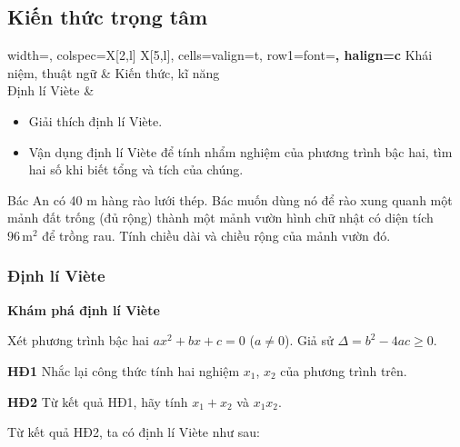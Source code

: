 \begin{lesson}
    \subsection{Kiến thức trọng tâm}

    \begin{center}
    \begin{tblr}{
        width=\linewidth,
        colspec={X[2,l] X[5,l]},
        cells={valign=t},
        row{1}={font=\bfseries, halign=c}
    }
        Khái niệm, thuật ngữ & Kiến thức, kĩ năng \\
        Định lí Viète &
        \begin{minipage}[t]{\linewidth}
        \begin{itemize}
            \item Giải thích định lí Viète.
            \item Vận dụng định lí Viète để tính nhẩm nghiệm của phương trình bậc hai, tìm hai số khi biết tổng và tích của chúng.
        \end{itemize}
        \end{minipage}
    \end{tblr}
    \end{center}

    Bác An có 40 m hàng rào lưới thép. Bác muốn dùng nó để rào xung quanh một mảnh đất trống (đủ rộng) thành một mảnh vườn hình chữ nhật có diện tích $96\,\text{m}^2$ để trồng rau. Tính chiều dài và chiều rộng của mảnh vườn đó.


    \subsubsection{Định lí Viète}

    \textbf{Khám phá định lí Viète}

    Xét phương trình bậc hai $ax^2+bx+c=0$ ($a\ne0$). Giả sử $\Delta=b^2-4ac\ge0$.

    \textbf{HĐ1} Nhắc lại công thức tính hai nghiệm $x_1$, $x_2$ của phương trình trên.

    \answerline

    \textbf{HĐ2} Từ kết quả HĐ1, hãy tính $x_1+x_2$ và $x_1x_2$.

    \answerline
    \answerline

    Từ kết quả HĐ2, ta có định lí Viète như sau:


\end{lesson}
